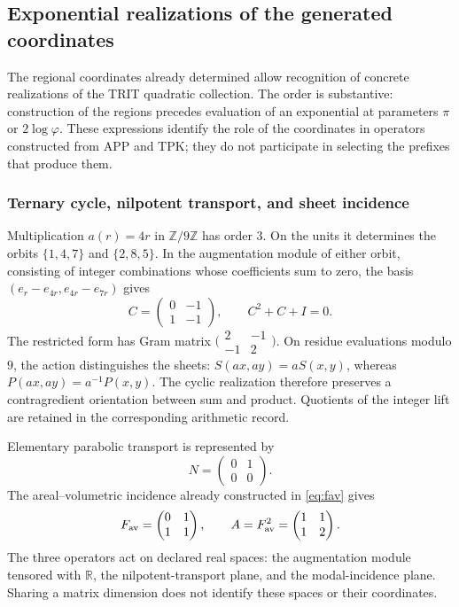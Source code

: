 \subsection{Exponential realizations of the generated coordinates}
\label{euler-trit-articulacion}

The regional coordinates already determined allow recognition of concrete
realizations of the TRIT quadratic collection. The order is substantive:
construction of the regions precedes evaluation of an exponential at
parameters \(\pi\) or \(2\log\varphi\). These expressions identify
the role of the coordinates in operators constructed from APP and TPK;
they do not participate in selecting the prefixes that produce them.

\subsubsection{Ternary cycle, nilpotent transport, and sheet incidence}

Multiplication \(a(r)=4r\) in \(\mathbb Z/9\mathbb Z\) has order
\(3\). On the units it determines the orbits \(\{1,4,7\}\) and
\(\{2,8,5\}\). In the augmentation module of either orbit, consisting
of integer combinations whose coefficients sum to zero, the basis
\((e_r-e_{4r},e_{4r}-e_{7r})\) gives
\[
 C=\begin{pmatrix}0&-1\\1&-1\end{pmatrix},
 \qquad C^2+C+I=0.
\]
The restricted form has Gram matrix
\(\bigl(\begin{smallmatrix}2&-1\\-1&2\end{smallmatrix}\bigr)\).
On residue evaluations modulo \(9\), the action distinguishes the sheets:
\(S(ax,ay)=aS(x,y)\), whereas \(P(ax,ay)=a^{-1}P(x,y)\).
The cyclic realization therefore preserves a contragredient orientation
between sum and product. Quotients of the integer lift are retained
in the corresponding arithmetic record.

Elementary parabolic transport is represented by
\[
 N=\begin{pmatrix}0&1\\0&0\end{pmatrix}.
\]
The areal--volumetric incidence already constructed in \eqref{eq:fav} gives
\[
 F_{\rm av}=\begin{pmatrix}0&1\\1&1\end{pmatrix},
 \qquad A=F_{\rm av}^2=\begin{pmatrix}1&1\\1&2\end{pmatrix}.
\]
The three operators act on declared real spaces: the augmentation module
tensored with \(\mathbb R\), the nilpotent-transport plane, and the
modal-incidence plane. Sharing a matrix dimension does not identify
these spaces or their coordinates.

